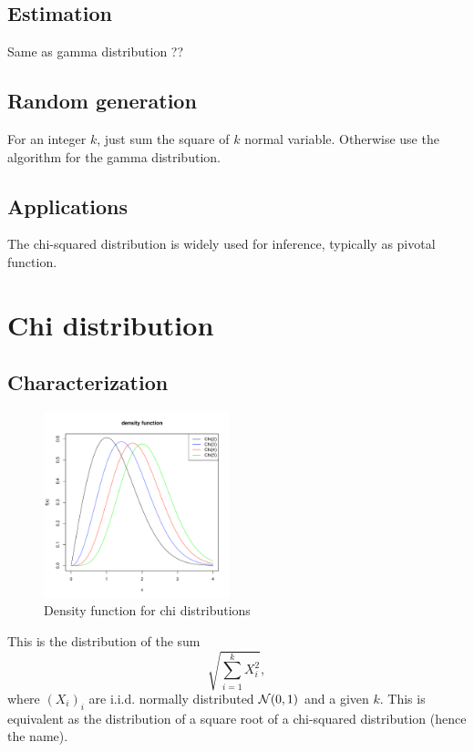 \subsection{Estimation}
Same as gamma distribution ??

\subsection{Random generation}
For an integer $k$, just sum the square of $k$ normal variable. Otherwise use the algorithm for the gamma distribution.

\subsection{Applications}
The chi-squared distribution is widely used for inference, typically as pivotal function.

\newpage
\section{Chi distribution}
\subsection{Characterization}
\begin{figure}
  \vspace{-20pt}
  \begin{center}
    \includegraphics[width=0.48\textwidth]{img/chizoom}
  \end{center}
  \vspace{-20pt}  
  \caption{Density function for chi distributions}
\end{figure}
This is the distribution of the sum
$$
\sqrt{\sum_{i=1}^k X_i^2},
$$
where $(X_i)_i$ are i.i.d. normally distributed $\mathcal N(0,1)$ and a given $k$. This is equivalent as the distribution of a square root of a chi-squared distribution (hence the name). 

